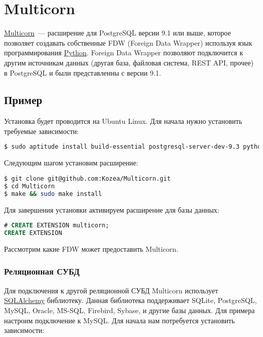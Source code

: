 \section{Multicorn}

\href{http://multicorn.org/}{Multicorn}~--- расширение для PostgreSQL версии 9.1 или выше, которое позволяет создавать собственные FDW (Foreign Data Wrapper) используя язык программирования \href{https://www.python.org/}{Python}. Foreign Data Wrapper позволяют подключится к другим источникам данных (другая база, файловая система, REST API, прочее) в PostgreSQL и были представленны с версии 9.1.


\subsection{Пример}

Установка будет проводится на Ubuntu Linux. Для начала нужно установить требуемые зависимости:

\begin{lstlisting}[language=Bash,label=lst:pgmulticorn1,caption=Multicorn]
$ sudo aptitude install build-essential postgresql-server-dev-9.3 python-dev python-setuptools
\end{lstlisting}

Следующим шагом установим расширение:

\begin{lstlisting}[language=Bash,label=lst:pgmulticorn2,caption=Multicorn]
$ git clone git@github.com:Kozea/Multicorn.git
$ cd Multicorn
$ make && sudo make install
\end{lstlisting}

Для завершения установки активируем расширение для базы данных:

\begin{lstlisting}[language=SQL,label=lst:pgmulticorn3,caption=Multicorn]
# CREATE EXTENSION multicorn;
CREATE EXTENSION
\end{lstlisting}

Рассмотрим какие FDW может предоставить Multicorn.


\subsubsection{Реляционная СУБД}

Для подключения к другой реляционной СУБД Multicorn использует \href{http://www.sqlalchemy.org/}{SQLAlchemy} библиотеку. Данная библиотека поддерживает SQLite, PostgreSQL, MySQL, Oracle, MS-SQL, Firebird, Sybase, и другие базы данных. Для примера настроим подключение к MySQL. Для начала нам потребуется установить зависимости:

